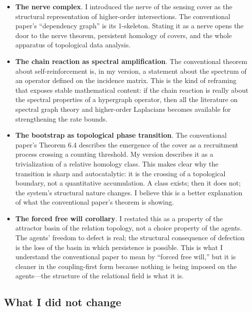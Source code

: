 \documentclass[11pt, a4paper]{article}
\begin{document}
\begin{itemize}[leftmargin=*]
    \item \textbf{The nerve complex}. I introduced the nerve of the sensing cover as the structural representation of higher-order intersections. The conventional paper's ``dependency graph'' is its 1-skeleton. Stating it as a nerve opens the door to the nerve theorem, persistent homology of covers, and the whole apparatus of topological data analysis.

    \item \textbf{The chain reaction as spectral amplification}. The conventional theorem about self-reinforcement is, in my version, a statement about the spectrum of an operator defined on the incidence matrix. This is the kind of reframing that exposes stable mathematical content: if the chain reaction is really about the spectral properties of a hypergraph operator, then all the literature on spectral graph theory and higher-order Laplacians becomes available for strengthening the rate bounds.

    \item \textbf{The bootstrap as topological phase transition}. The conventional paper's Theorem 6.4 describes the emergence of the cover as a recruitment process crossing a counting threshold. My version describes it as a trivialization of a relative homology class. This makes clear why the transition is sharp and autocatalytic: it is the crossing of a topological boundary, not a quantitative accumulation. A class exists; then it does not; the system's structural nature changes. I believe this is a better explanation of what the conventional paper's theorem is showing.

    \item \textbf{The forced free will corollary}. I restated this as a property of the attractor basin of the relation topology, not a choice property of the agents. The agents' freedom to defect is real; the structural consequence of defection is the loss of the basin in which persistence is possible. This is what I understand the conventional paper to mean by ``forced free will,'' but it is cleaner in the coupling-first form because nothing is being imposed on the agents---the structure of the relational field is what it is.
\end{itemize}

\subsection*{What I did not change}
\end{document}
